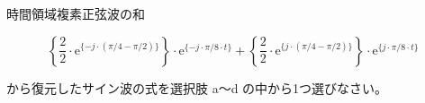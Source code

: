時間領域複素正弦波の和

\[
\left \{ \frac{2}{2} \cdot \textrm{e}^{\{-j \cdot (\pi/4 - \pi/2) \}} \right \} \cdot \textrm{e}^{\{-j \cdot \pi/8 \cdot t \}} +  
\left \{ \frac{2}{2} \cdot \textrm{e}^{\{ j \cdot (\pi/4 - \pi/2) \}} \right \} \cdot \textrm{e}^{\{ j \cdot \pi/8 \cdot t \}}
\]

\bigskip
\noindent から復元したサイン波の式を選択肢 a〜d の中から1つ選びなさい。
